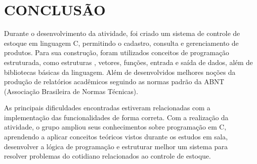 \documentclass[12pt, a4paper, brazil]{article}
\begin{document}
\section{CONCLUSÃO}

Durante o desenvolvimento da atividade, foi criado um sistema de controle de estoque em linguagem C, permitindo o cadastro, consulta e gerenciamento de produtos. Para sua construção, foram utilizados conceitos de programação estruturada, como estruturas , vetores, funções, entrada e saída de dados, além de bibliotecas básicas da linguagem. Além de desenvolvidos melhores noções da produção de relatórios acadêmicos seguindo as normas padrão da ABNT (Associação Brasileira de Normas Técnicas).

As principais dificuldades encontradas estiveram relacionadas com a implementação das funcionalidades de forma correta. Com a realização da atividade, o grupo ampliou seus conhecimentos sobre programação em C, aprendendo a aplicar conceitos teóricos vistos durante os estudos em sala, desenvolver a lógica de programação e estruturar melhor um sistema para resolver problemas do cotidiano relacionados ao controle de estoque.
\end{document}
